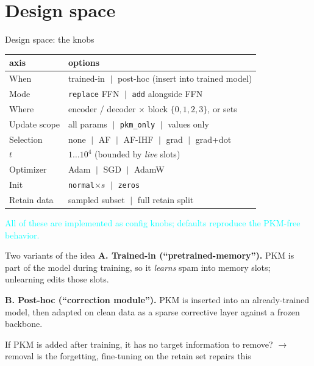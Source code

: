 \documentclass{beamer}
\newcommand{\pierre}[1]{\textcolor{cyan}{#1}}
\begin{document}
\section{Design space}

\begin{frame}{Design space: the knobs}
\begin{center}
\begin{tabular}{|l|l|}
\hline
\textbf{axis} & \textbf{options} \\
\hline
When       & trained-in $\;|\;$ post-hoc (insert into trained model) \\
Mode       & \texttt{replace} FFN $\;|\;$ \texttt{add} alongside FFN \\
Where      & encoder / decoder $\times$ block $\{0,1,2,3\}$, or sets \\
Update scope & all params $\;|\;$ \texttt{pkm\_only} $\;|\;$ values only \\
Selection  & none $\;|\;$ AF $\;|\;$ AF-IHF $\;|\;$ grad $\;|\;$ grad+dot \\
$t$        & $1 \ldots 10^4$ (bounded by \emph{live} slots) \\
Optimizer  & Adam $\;|\;$ SGD $\;|\;$ AdamW \\
Init       & \texttt{normal}$\times s$ $\;|\;$ \texttt{zeros} \\
Retain data & sampled subset $\;|\;$ full retain split \\
\hline
\end{tabular}
\end{center}

\pierre{All of these are implemented as config knobs; defaults reproduce the
PKM-free behavior.}
\end{frame}

\begin{frame}{Two variants of the idea}
\textbf{A. Trained-in (``pretrained-memory'').}
PKM is part of the model during training, so it \emph{learns} spam into memory
slots; unlearning edits those slots.

\medskip
\textbf{B. Post-hoc (``correction module'').}
PKM is inserted into an already-trained model, then adapted on clean data as a
sparse corrective layer against a frozen backbone.

\medskip
If PKM is added after training, it has no target information to remove? $\to$ removal is the forgetting, fine-tuning on the retain set repairs this

\end{frame}
\end{document}
